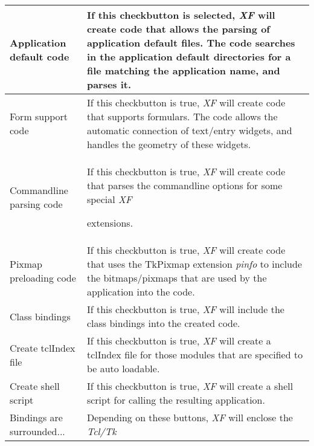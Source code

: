 {\newpage
\clearpage
\samepage \begin{supertabular}{|l|p{6.2cm}|}
Application default code     & If this checkbutton is
                               selected, {\em XF }
 will create
                               code that allows the parsing
                               of application default files.
                               The code searches in the
                               application default
                               directories for a file
                               matching the application
                               name, and parses it.\\  \hline
Form support code            & If this checkbutton is true,
                               {\em XF }
 will create code that
                               supports formulars. The code
                               allows the automatic
                               connection of text/entry
                               widgets, and handles the
                               geometry of these widgets.\\  \hline
Commandline parsing code     & If this checkbutton is true,
                               {\em XF }
 will create code that
                               parses the commandline
                               options for some special {\em XF }

                               extensions.\\  \hline
Pixmap preloading code       & If this checkbutton is true,
                               {\em XF }
 will create code that
                               uses the TkPixmap extension
                               {\em pinfo\em} to include the
                               bitmaps/pixmaps that are used
                               by the application into the
                               code.\\  \hline
Class bindings               & If this checkbutton is true,
                               {\em XF }
 will include the class
                               bindings into the created
                               code.\\  \hline
Create tclIndex file         & If this checkbutton is true,
                               {\em XF }
 will create a tclIndex
                               file for those modules that
                               are specified to be auto
                               loadable.\\  \hline 
Create shell script          & If this checkbutton is true,
                               {\em XF }
 will create a shell
                               script for calling the
                               resulting application.\\  \hline
Bindings are surrounded...   & Depending on these buttons,
                               {\em XF }
 will enclose the {\em Tcl/Tk }


\end{supertabular}}
